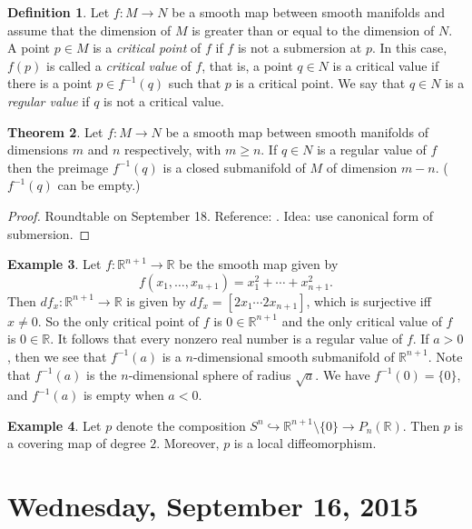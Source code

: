 \documentclass{amsart}
\numberwithin{equation}{section}
\newcommand{\bR}{\mathbb{R}}
\theoremstyle{definition}
\newtheorem{definition}{Definition} [section]
\newtheorem{example}[definition]{Example}
\theoremstyle{theorem}
\newtheorem{theorem}[definition]{Theorem}
\begin{document}
\begin{definition}
Let $f : M \to N$ be a smooth map between smooth manifolds and assume that the dimension of $M$ is greater than or equal to the dimension of $N$. A point $p \in M$ is a {\em critical point} of $f$ if $f$ is not a submersion at $p$. 
In this case, $f(p)$ is called a {\em critical value} of $f$, that is, a point $q \in N$ is a critical value 
if there is a point $p \in f^{-1}(q)$ such that $p$ is a critical point. We say that $q \in N$ is a 
{\em regular value} if $q$ is not a critical value. 
\end{definition}

\begin{theorem} \label{preimage}
Let $f : M \to N$ be a smooth map between smooth manifolds of dimensions $m$ and $n$ respectively, with $m \ge n$. 
If $q \in N$ is a regular value of $f$ then the preimage $f^{-1}(q)$ is a closed submanifold of $M$ of 
dimension $m - n$. ($f^{-1}(q)$ can be empty.) 
\end{theorem}

\begin{proof}
Roundtable on September 18. Reference: \cite[III.5]{Bo}.  Idea: use canonical form of submersion.
\end{proof}


\begin{example}
Let $f : \bR^{n+1} \to \bR$ be the smooth map given by 
\[
f(x_1, \ldots, x_{n+1}) = x_1^2 + \cdots + x_{n+1}^2.
\]
Then $df_x:\bR^{n+1}\to \bR$ is given by $df_x=[2x_1 \cdots 2x_{n+1}]$, which is
surjective iff $x\ne 0$. So the only critical point of $f$ is $0\in \bR^{n+1}$
and the only critical value of $f$ is $0\in \bR$. It follows that every nonzero real number
is a regular value of $f$. 
If $a > 0$, then we see that $f^{-1}(a)$ is a $n$-dimensional smooth submanifold of $\bR^{n+1}$. 
Note that $f^{-1}(a)$ is the $n$-dimensional sphere of radius $\sqrt{a}$. 
We have $f^{-1}(0)=\{0\}$, and $f^{-1}(a)$ is empty when $a<0$. 
\end{example}

\begin{example}
Let $p$ denote the composition $S^n \hookrightarrow \mathbb{R}^{n+1}\setminus \{0\} \to P_n(\mathbb{R})$. Then $p$ is a covering map of degree $2$. Moreover, $p$ is a local diffeomorphism. 
\end{example}





\section{Wednesday, September 16, 2015}
\end{document}
